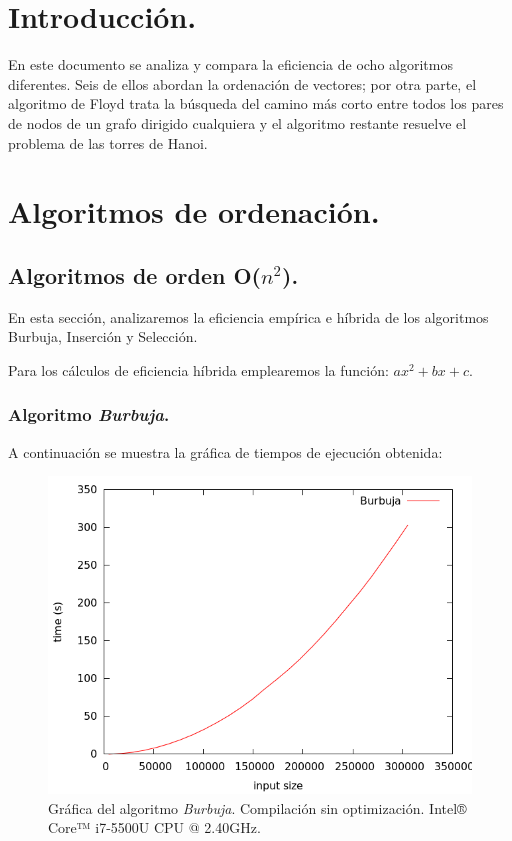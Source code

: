 \documentclass[11pt,a4paper]{article}
\begin{document}
	\section{Introducción.}

		\par
		En este documento se analiza y compara la eficiencia de ocho algoritmos diferentes. Seis de ellos abordan la ordenación de vectores; por otra parte, el algoritmo de Floyd trata la búsqueda del camino más corto entre todos los pares de nodos de un grafo dirigido cualquiera y el algoritmo restante resuelve el problema de las torres de Hanoi.

	\section{Algoritmos de ordenación.}

		\subsection{Algoritmos de orden O($n^2$).}

			\par
			En esta sección, analizaremos la eficiencia empírica e híbrida de los algoritmos Burbuja, Inserción y Selección.

			\par
			Para los cálculos de eficiencia híbrida emplearemos la función: $ax^2+bx+c$.

			\subsubsection{Algoritmo \textit{Burbuja}.}

				\par
				A continuación se muestra la gráfica de tiempos de ejecución obtenida:

				\begin{figure}[h]

					\centering
					\includegraphics[width=1\textwidth]{burbuja.png}
					\caption{Gráfica del algoritmo \textit{Burbuja}. Compilación sin optimización. Intel® Core™ i7-5500U CPU @ 2.40GHz.}

				\end{figure}
\end{document}
